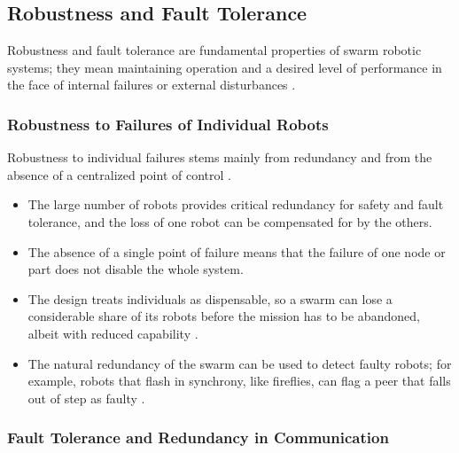 \subsection{Robustness and Fault Tolerance}

Robustness and fault tolerance are fundamental properties of swarm robotic
systems; they mean maintaining operation and a desired level of performance in
the face of internal failures or external disturbances
\cite{dias2021swarm,brambilla2013swarm}.

\subsubsection{Robustness to Failures of Individual Robots}

Robustness to individual failures stems mainly from redundancy and from the
absence of a centralized point of control \cite{dias2021swarm,tan2013research}.
\begin{itemize}
  \item {} The large number of robots provides critical
        redundancy for safety and fault tolerance, and the loss of one robot can
        be compensated for by the others.
  \item {} The absence of a single point of failure means
        that the failure of one node or part does not disable the whole system.
  \item {} The design treats individuals as
        dispensable, so a swarm can lose a considerable share of its robots
        before the mission has to be abandoned, albeit with reduced capability
        \cite{tan2016handbook}.
  \item {} The natural redundancy of the swarm can be used to
        detect faulty robots; for example, robots that flash in synchrony, like
        fireflies, can flag a peer that falls out of step as faulty
        \cite{brambilla2013swarm}.
\end{itemize}

\subsubsection{Fault Tolerance and Redundancy in Communication}

